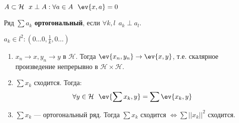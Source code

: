 \begin{definition}
    \(A \subset \mathcal{H} \ \ x \perp A : \forall a \in A \ \ \ev{x, a} = 0\)
\end{definition}

\begin{definition}
    Ряд \(\sum a_k\) \textbf{ортогональный}, если \(\forall k, l \ \ a_k \perp a_l\).
\end{definition}

\begin{example}
    \(a_k \in l^2 : (0 \dots 0, \frac{1}{k}, 0 \dots )\)
\end{example}

\begin{theorem}\itemfix
    \begin{enumerate}
        \item \(x_n \to x, y_n \to y\) в \(\mathcal{H}\). Тогда \(\ev{x_n, y_n} \to \ev{x, y}\), т.е. скалярное произведение непрерывно в \(\mathcal{H} \times \mathcal{H}\).
        \item \(\sum x_k\) сходится. Тогда:
              \begin{equation}
                  \label{линейность произведения}
                  \forall y \in \mathcal{H} \ \ \ev{\sum x_k, y} = \sum \ev{x_k, y}
              \end{equation}
        \item \(\sum x_k\) --- ортогональный ряд. Тогда \(\sum x_k\) сходится \(\Leftrightarrow \sum ||x_k||^2\) сходится.
    \end{enumerate}
\end{theorem}
